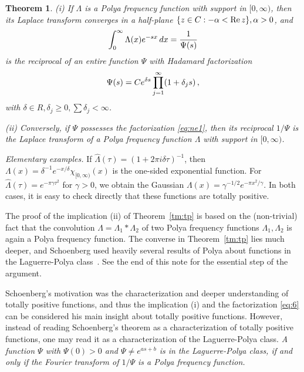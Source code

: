 \documentclass{article}
\newcommand{\tmem}[1]{{\em #1\/}}
\newtheorem{tm}{Theorem}
\newcommand{\fif}{if and only if}
\newtheorem{tm}{Theorem}
\providecommand{\*}{{\opl}}
\newcommand{\field}[1]{#1}
\newcommand{\bR}{\field{R}}
\newcommand{\bC}{\field{C}}
\newcommand{\<}{}
\newcommand{\>}{}
\newcommand{\inv}{^{- 1}}
\newcommand{\tp}{totally positive}
\newcommand{\lpc}{Laguerre-Polya class}
\newcommand{\pff}{Polya frequency function}
\begin{document}
\begin{tm}
  \label{tm:onesided}(i) If $\Lambda$ is a Polya frequency function with
  support in $[0, \infty)$, then its Laplace transform converges in a
  half-plane $\{z \in \bC : - \alpha < \mathrm{Re} \hspace{0.17em} z\}, \alpha
  > 0$, and
  \begin{equation}
    \label{eq:5} \int_0^{\infty} \Lambda (x) e^{- sx}  \hspace{0.17em} dx =
    \frac{1}{\Psi (s)}
  \end{equation}
  is the reciprocal of an entire function $\Psi$ with Hadamard factorization
  \begin{equation}
    \label{eq:ne1} \Psi (s) = Ce^{\delta s}  \prod_{j = 1}^{\infty} (1 +
    \delta_j s) \hspace{0.17em},
  \end{equation}
  with $\delta \in \bR, \delta_j \geq 0, \sum \delta_j < \infty$.
  
  (ii) Conversely, if $\Psi$ possesses the factorization \eqref{eq:ne1}, then
  its reciprocal $1 / \Psi$ is the Laplace transform of a Polya frequency
  function $\Lambda$ with support in $[0, \infty)$.
\end{tm}

{\vspace{3mm}}

{\tmem{Elementary examples.}} If $\hat{\Lambda} (\tau) = (1 + 2 \pi i \delta
\tau) \inv$, then $\Lambda (x) = \delta \inv e^{- x / \delta} \chi_{[0,
\infty)} (x)$ is the one-sided exponential function. For $\hat{\Lambda} (\tau)
= e^{- \pi \gamma \tau^2}$ for $\gamma > 0$, we obtain the Gaussian $\Lambda
(x) = \gamma^{- 1 / 2} e^{- \pi x^2 / \gamma}$. In both cases, it is easy to
check directly that these functions are {\tp}.

The proof of the implication (ii) of Theorem~\ref{tm:tp} is based on the
(non-trivial) fact that the convolution $\Lambda = \Lambda_1 \ast \Lambda_2$
of two {\pff}s $\Lambda_1, \Lambda_2$ is again a {\pff}. The converse in
Theorem~\ref{tm:tp} lies much deeper, and Schoenberg used heavily several
results of Polya about functions in the {\lpc}~{\cite{Pol15,PS1914}}. See the
end of this note for the essential step of the argument.

Schoenberg's motivation was the characterization and deeper understanding of
{\tp} functions, and thus the implication (i) and the factorization
\eqref{eq:6} can be considered his main insight about {\tp} functions.
However, instead of reading Schoenberg's theorem as a characterization of
{\tp} functions, one may read it as a characterization of the {\lpc}. {\tmem{A
function $\Psi$ with $\Psi (0) > 0$ and $\Psi \neq e^{as + b}$ is in the
{\lpc}, {\fif} the Fourier transform of $1 / \Psi$ is a {\pff}.}}
\end{document}
